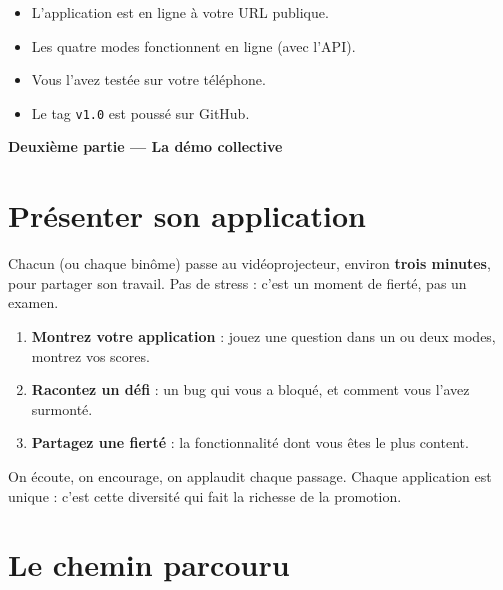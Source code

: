 \documentclass[11pt,a4paper]{article}
\newcommand{\cmark}{\ding{51}}
\newcommand{\code}[1]{\texttt{#1}}
\begin{document}
\begin{projetbox}
\begin{itemize}[leftmargin=*,noitemsep]
  \item[\cmark] L'application est en ligne à votre URL publique.
  \item[\cmark] Les quatre modes fonctionnent en ligne (avec l'API).
  \item[\cmark] Vous l'avez testée sur votre téléphone.
  \item[\cmark] Le tag \code{v1.0} est poussé sur GitHub.
\end{itemize}
\end{projetbox}

\bigskip
\begin{center}\large\textbf{Deuxième partie --- La démo collective}\end{center}

\section{Présenter son application}

Chacun (ou chaque binôme) passe au vidéoprojecteur, environ \textbf{trois minutes}, pour partager son travail. Pas de stress : c'est un moment de fierté, pas un examen.

\begin{objectifbox}
\begin{enumerate}[leftmargin=*]
  \item \textbf{Montrez votre application} : jouez une question dans un ou deux modes, montrez vos scores.
  \item \textbf{Racontez un défi} : un bug qui vous a bloqué, et comment vous l'avez surmonté.
  \item \textbf{Partagez une fierté} : la fonctionnalité dont vous êtes le plus content.
\end{enumerate}
\end{objectifbox}

On écoute, on encourage, on applaudit chaque passage. Chaque application est unique : c'est cette diversité qui fait la richesse de la promotion.

\section{Le chemin parcouru}
\end{document}
